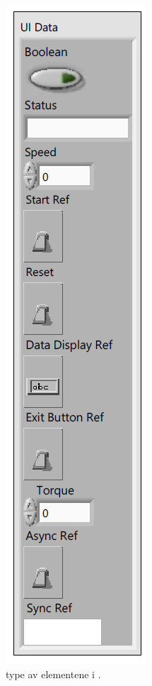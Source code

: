\begin{multicols}{2}
\begin{figure}[H]
    \includegraphics[scale=0.5]{vis/UI.PNG}
    \caption{\Gls{type} av elementene i .}
    \label{fig:UI}
\end{figure}
\end{multicols}
